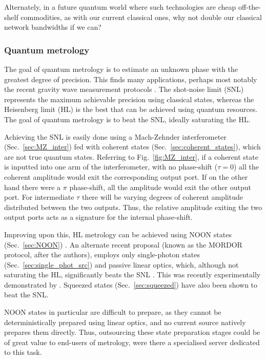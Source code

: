 Alternately, in a future quantum world where such technologies are cheap off-the-shelf commodities, as with our current classical ones, why not double our classical network bandwidths if we can?

%
%

\subsubsection{Quantum metrology} \label{sec:metrology} 


The goal of quantum metrology is to estimate an unknown phase with the greatest degree of precision. This finds many applications, perhaps most notably the recent gravity wave measurement protocols \cite{???}. The shot-noise limit (SNL) represents the maximum achievable precision using classical states, whereas the Heisenberg limit (HL) is the best that can be achieved using quantum resources. The goal of quantum metrology is to beat the SNL, ideally saturating the HL.

Achieving the SNL is easily done using a Mach-Zehnder interferometer (Sec.~\ref{sec:MZ_inter}) fed with coherent states (Sec.~\ref{sec:coherent_states}), which are not true quantum states. Referring to Fig.~\ref{fig:MZ_inter}, if a coherent state is inputted into one arm of the interferometer, with no phase-shift (\mbox{$\tau=0$}) all the coherent amplitude would exit the corresponding output port. If on the other hand there were a $\pi$ phase-shift, all the amplitude would exit the other output port. For intermediate $\tau$ there will be varying degrees of coherent amplitude distributed between the two outputs. Thus, the relative amplitude exiting the two output ports acts as a signature for the internal phase-shift.

Improving upon this, HL metrology can be achieved using NOON states (Sec.~\ref{sec:NOON}) \cite{bib:Dowling08}. An alternate recent proposal (known as the MORDOR protocol, after the authors), employs only single-photon states (Sec.~\ref{sec:single_phot_src}) and passive linear optics, which, although not saturating the HL, significantly beats the SNL \cite{bib:MORDOR15, bib:MORDOR2}. This was recently experimentally demonstrated by \cite{???}. Squeezed states (Sec.~\ref{sec:squeezed}) have also been shown to beat the SNL.

NOON states in particular are difficult to prepare, as they cannot be deterministically prepared using linear optics, and no current source natively prepares them directly. Thus, outsourcing these state preparation stages could be of great value to end-users of metrology, were there a specialised server dedicated to this task.

